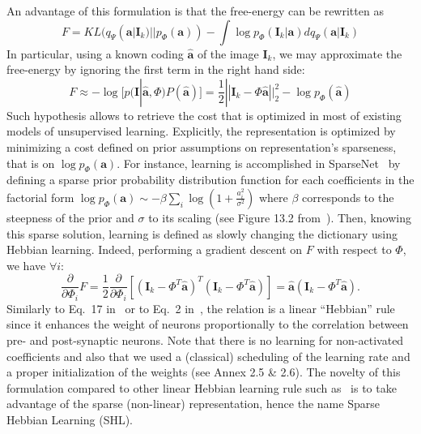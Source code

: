 \documentclass[draft]{article} %
\newcommand{\coef}{\mathbf{a}} %
\newcommand{\image}{\mathbf{I}} %
\newcommand{\dico}{\Phi} %
\newcommand{\norm}[1]{|\!| #1 |\!|}
\begin{document}
An advantage of this formulation is that the free-energy can be rewritten as
\begin{equation} F = KL( q_\Psi(\coef | \image_k) || p_\dico(\coef) ) - \int \log p_\dico(\image_k | \coef ) dq_\Psi(\coef | \image_k) \end{equation}
In particular, using a known coding $\hat{\coef}$ of the image $\image_k$, we may approximate the free-energy by ignoring the first term in the right hand side:
\begin{equation} F \approx - \log [ p(\image | \hat{\coef}, \dico ) P(\hat{\coef}) ] = \frac{1}{2} \norm{\image_k - \dico \hat{\coef}}_2^2 - \log p_\dico(\hat{\coef}) \label{eq:sparse_cost} \end{equation}
Such hypothesis allows to retrieve the cost that is optimized in most of existing models of unsupervised learning. Explicitly, the representation is optimized by minimizing a cost defined on prior assumptions on representation's sparseness, that is on $\log p_\dico( \coef )$. For instance, learning is accomplished in {\sc SparseNet}~\citep{Olshausen97} by defining a sparse prior probability distribution function for each coefficients in the factorial form $\log p_\dico(\coef) \sim -\beta \sum_i \log ( 1 + \frac{a_i^2}{\sigma^2} )$ where $\beta$ corresponds to the steepness of the prior and $\sigma$ to its scaling (see Figure 13.2 from~\citep{Olshausen02}). Then, knowing this sparse solution, learning is defined as slowly changing the dictionary using Hebbian learning.
Indeed, performing a gradient descent on $F$ with respect to $\dico$, we have $\forall i$:
$$ \frac{\partial }{\partial \dico_i } F = \frac{1}{2} \frac{\partial }{\partial \dico_i }[(\image_k - \dico^T \hat{\coef})^T (\image_k - \dico^T \hat{\coef})] = \hat{\coef} (\image_k - \dico^T \hat{\coef}).$$
Similarly to Eq.~17 in~\citep{Olshausen97} or to Eq.~2 in~\citep{Smith06}, the relation is a linear ``Hebbian'' rule~\citep{Hebb49} since it enhances the weight of neurons proportionally to the correlation between pre- and post-synaptic neurons. Note that there is no learning for non-activated coefficients and also that we used a (classical) scheduling of the learning rate and a proper initialization of the weights (see Annex 2.5 \& 2.6). The novelty of this formulation compared to other linear Hebbian learning rule such as~\citep{Oja82} is to take advantage of the sparse (non-linear) representation, hence the name Sparse Hebbian Learning (SHL).
\end{document}

